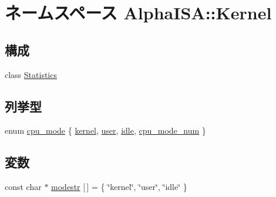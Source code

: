 \hypertarget{namespaceAlphaISA_1_1Kernel}{
\section{ネームスペース AlphaISA::Kernel}
\label{namespaceAlphaISA_1_1Kernel}
}
\subsection*{構成}
\begin{DoxyCompactItemize}
\item 
class \hyperlink{classAlphaISA_1_1Kernel_1_1Statistics}{Statistics}
\end{DoxyCompactItemize}
\subsection*{列挙型}
\begin{DoxyCompactItemize}
\item 
enum \hyperlink{namespaceAlphaISA_1_1Kernel_aa1fc3805dac6f71f457fbbc263105bf6}{cpu\_\-mode} \{ \hyperlink{namespaceAlphaISA_1_1Kernel_aa1fc3805dac6f71f457fbbc263105bf6adb0339d028e596254368234e5ab09f9d}{kernel}, 
\hyperlink{namespaceAlphaISA_1_1Kernel_aa1fc3805dac6f71f457fbbc263105bf6a04981b8c09a50ccfb1d92fc11b81c36a}{user}, 
\hyperlink{namespaceAlphaISA_1_1Kernel_aa1fc3805dac6f71f457fbbc263105bf6a0e9a37114c0e458d28d52f06ec0f2242}{idle}, 
\hyperlink{namespaceAlphaISA_1_1Kernel_aa1fc3805dac6f71f457fbbc263105bf6a4572f7cf10830e04921c8896f22102ba}{cpu\_\-mode\_\-num}
 \}
\end{DoxyCompactItemize}
\subsection*{変数}
\begin{DoxyCompactItemize}
\item 
const char $\ast$ \hyperlink{namespaceAlphaISA_1_1Kernel_a779f5671616442e377e5078bf4c9bd82}{modestr} \mbox{[}$\,$\mbox{]} = \{ \char`\"{}kernel\char`\"{}, \char`\"{}user\char`\"{}, \char`\"{}idle\char`\"{} \}
\end{DoxyCompactItemize}


